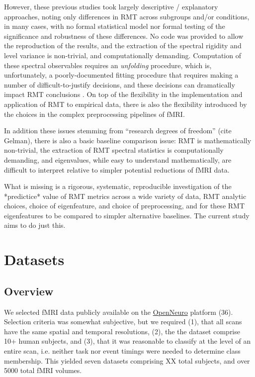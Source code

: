 \documentclass[12pt]{spieman}  %
\begin{document}
\begin{spacing}{2}
However, these previous studies took largely descriptive / explanatory
approaches, noting only differences in RMT across subgroups and/or conditions,
in many cases, with no formal statistical model nor formal testing of the
significance and robustness of these differences. No code was provided to allow
the reproduction of the results, and the extraction of the spectral rigidity
and level variance is non-trivial, and computationally demanding. Computation
of these spectral observables requires an \textit{unfolding}
procedure\cite{guhrRandommatrixTheoriesQuantum1998a,mehtaRandomMatrices2004},
which is, unfortunately, a poorly-documented fitting procedure that requires
making a number of difficult-to-justify decisions, and these decisions can
dramatically impact RMT conclusions
\cite{abul-magdUnfoldingSpectrumChaotic2014,abueleninSpectralUnfoldingChaotic2018,fossionRandommatrixSpectraTime2013,abueleninEffectUnfoldingSpectral2012,moralesImprovedUnfoldingDetrending2011}.
On top of the flexibility in the implementation and application of RMT to
empirical data, there is also the flexibility introduced by the choices in the
complex preprocessing pipelines of fMRI\cite{parkerBenefitSliceTiming2019}.

In addition these issues stemming from ``research degrees of freedom'' (cite
Gelman), there is also a basic baseline comparison issue: RMT is mathematically
non-trivial, the extraction of RMT spectral statistics is computationally
demanding, and eigenvalues, while easy to understand mathematically, are
difficult to interpret relative to simpler potential reductions of fMRI data.

What is missing is a rigorous, systematic, reproducible investigation of the
*predictice* value of RMT metrics across a wide variety of data, RMT analytic
choices, choice of eigenfeature, and choice of preprocessing, and for these RMT
eigenfeatures to be compared to simpler alternative baselines. The current
study aims to do just this.


\section{Datasets}
\label{sec:datasets}

\subsection{Overview}

We selected fMRI data publicly available on the
\href{https://openneuro.org/}{OpenNeuro} platform (36). Selection criteria was
somewhat subjective, but we required (1), that all scans have the same spatial
and temporal resolutions, (2), the the dataset comprise 10+ human subjects, and
(3), that it was reasonable to classify at the level of an entire scan, i.e.
neither task nor event timings were needed to determine class membership. This
yielded seven datasets comprising XX total subjects, and over 5000 total fMRI
volumes.


\end{spacing}
\end{document}
